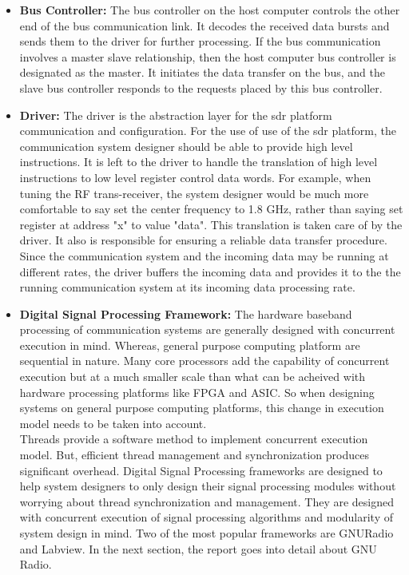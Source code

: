 \begin{itemize}
\item{\textbf{Bus Controller:} The bus controller on the host computer controls the other end of the bus communication link.
It decodes the received data bursts and sends them to the driver for further processing.
If the bus communication involves a master slave relationship, then the host computer bus controller is designated as the master.
It initiates the data transfer on the bus, and the slave bus controller  responds to the requests placed by this bus controller.
}
\item{\textbf{Driver:} The driver is the abstraction layer for the \ac{sdr} platform communication and configuration.
For the use of use of the \ac{sdr} platform, the communication system designer should be able to provide high level instructions.
It is left to the driver to handle the translation of high level instructions to low level register control data words.
For example, when tuning the RF trans-receiver, the system designer would be much more comfortable to say set the center frequency to 1.8 GHz, rather than saying set register at address "x" to value "data".
This translation is taken care of by the driver.
It also is responsible for ensuring a reliable data transfer procedure.
Since the communication system and the incoming data may be running at different rates, the driver buffers the incoming data and provides it to the the running communication system at its incoming data processing rate.}
\item{\textbf{Digital Signal Processing Framework:} The hardware baseband processing of communication systems are generally designed with concurrent execution in mind.
Whereas, general purpose computing platform are sequential in nature. Many core processors add the capability of concurrent execution but at a much smaller scale than what can be acheived with hardware processing platforms like \ac{FPGA} and \ac{ASIC}.
So when designing systems on general purpose computing platforms, this change in execution model needs to be taken into account.\\

Threads provide a software method to implement concurrent execution model. 
But, efficient thread management and synchronization produces significant overhead.
Digital Signal Processing frameworks are designed to help system designers to only design their signal processing modules without worrying about thread synchronization and management.
They are designed with concurrent execution of signal processing algorithms and modularity of system design in mind.
Two of the most popular frameworks are GNURadio and Labview.
In the next section, the report goes into detail about GNU Radio. 
}
\end{itemize}
